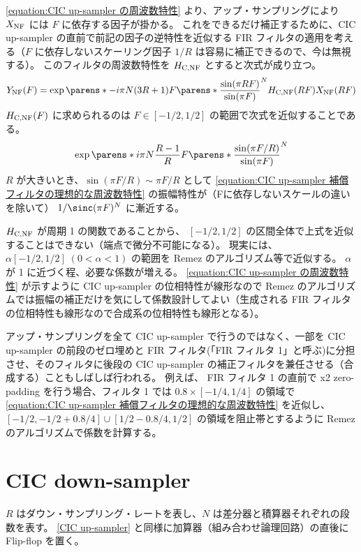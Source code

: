         \cref{equation:CIC up-sampler の周波数特性} より、アップ・サンプリングにより $X_\text{NF}$ には $F$ に依存する因子が掛かる。
        これをできるだけ補正するために、CIC up-sampler の直前で前記の因子の逆特性を近似する FIR フィルタの適用を考える（$F$ に依存しないスケーリング因子 $1/R$ は容易に補正できるので、今は無視する）。
        このフィルタの周波数特性を $H_\text{C,NF}$ とすると次式が成り立つ。
        \[ \YNF(F) = \exp\parens*{-i\pi N(3R+1)F}\parens*{\frac{\sin(\pi R F)}{\sin(\pi F)}}^N \HCNF(R F)\XNF(R F) \]
        $H_\text{C,NF}(F)$ に求められるのは $F \in [-1/2,1/2]$ の範囲で次式を近似することである。
        \begin{equation}
            \exp\parens*{i\pi N\frac{R-1}{R}F}\parens*{\frac{\sin(\pi F/R)}{\sin(\pi F)}}^N \label{equation:CIC up-sampler 補償フィルタの理想的な周波数特性}
        \end{equation}
        $R$ が大きいとき、$\sin(\pi F/R) \sim \pi F/R$ として \cref{equation:CIC up-sampler 補償フィルタの理想的な周波数特性} の振幅特性が（Fに依存しないスケールの違いを除いて） $1/\sinc(\pi F)^N$ に漸近する。
        \par
        $H_\text{C,NF}$ が周期 1 の関数であることから、 $[-1/2,1/2]$ の区間全体で上式を近似することはできない（端点で微分不可能になる）。
        現実には、$\alpha[-1/2,1/2]\;(0<\alpha<1)$ の範囲を Remez のアルゴリズム等で近似する。
        $\alpha$ が 1 に近づく程、必要な係数が増える。
        \cref{equation:CIC up-sampler の周波数特性} が示すように CIC up-sampler の位相特性が線形なので Remez のアルゴリズムでは振幅の補正だけを気にして係数設計してよい（生成される FIR フィルタの位相特性も線形なので合成系の位相特性も線形となる）。
        \par
        アップ・サンプリングを全て CIC up-sampler で行うのではなく、一部を CIC up-sampler の前段のゼロ埋めと FIR フィルタ(「FIR フィルタ 1」と呼ぶ)に分担させ、そのフィルタに後段の CIC up-sampler の補正フィルタを兼任させる（合成する）こともしばしば行われる。
        例えば、 FIR フィルタ 1 の直前で x2 zero-padding を行う場合、フィルタ 1 では $0.8\times[-1/4,1/4]$ の領域で \cref{equation:CIC up-sampler 補償フィルタの理想的な周波数特性} を近似し、$[-1/2,-1/2+0.8/4]\cup[1/2-0.8/4,1/2]$ の領域を阻止帯とするように Remez のアルゴリズムで係数を計算する。
\section{CIC down-sampler}
    $R$ はダウン・サンプリング・レートを表し、$N$ は差分器と積算器それぞれの段数を表す。
    \ref{CIC up-sampler} と同様に加算器（組み合わせ論理回路）の直後に Flip-flop を置く。
